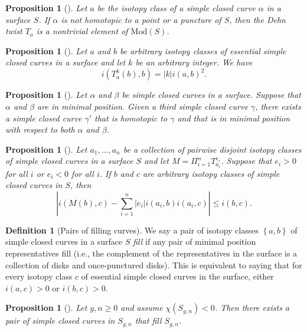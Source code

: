\documentclass[reqno]{amsart}
\newtheorem{proposition}[theorem]{Proposition}
\theoremstyle{definition}
\newtheorem{definition}[theorem]{Definition}
\theoremstyle{remark}
\newcommand{\Mod}{{\mathrm{Mod}}}
\begin{document}
\begin{proposition}[]
    Let $a$ be the isotopy class of a simple closed curve
    $\alpha$ in a surface $S$. If $\alpha$ is not
    homotopic to a point or a puncture of $S$, then the
    Dehn twist $T_a$ is a nontrivial element of $\Mod(S)$.
\end{proposition}

\begin{proposition}[]
    Let $a$ and $b$ be arbitrary isotopy classes of essential
    simple closed curves in a surface and let $k$ be
    an arbitrary integer. We have
    \[
    i \left( T_{a}^{k}(b), b \right) =
    \left| k \right| i\left( a,b \right)^2.
    \] 
\end{proposition}

\begin{proposition}[]
    Let $\alpha$ and $\beta$ be simple closed curves in a surface.
    Suppose that $\alpha$ and $\beta$ are in minimal position.
    Given a third simple closed curve $\gamma$, there
    exists a simple closed curve $\gamma'$ that is
    homotopic to $\gamma$ and that is in minimal position
    with respect to both $\alpha$ and $\beta$.
\end{proposition}


\begin{proposition}[]
    Let $a_1 ,\ldots, a_n$ be a collection of pairwise
    disjoint isotopy classes of simple closed curves in
    a surface $S$ and let $M = \Pi_{i=1}^{n}T_{a_i}^{e_i}$.
    Suppose that $e_i > 0$ for all $i$ or $e_i < 0$ for
    all $i$. If $b$ and $c$ are arbitrary isotopy
    classes of simple closed curves in $S$, then
    \[
    \left| i \left( M(b), c \right) -
    \sum_{i=1}^{n} \left| e_i \right| i(a_i,b)
    i(a_i,c) \right| \le i(b,c).
    \] 
\end{proposition}

\begin{definition}[Pairs of filling curves]
    We say a pair of isotopy classes $\left\{ a,b \right\} $ of
    simple closed curves in a surface $S$ \textit{fill} if
    any pair of minimal position representatives
    fill (i.e., the complement of the representatives
    in the surface is a collection of disks and
    once-punctured disks).
    This is equivalent to saying that for every
    isotopy class $c$ of essential simple closed curves
    in the surface, either
    $i \left( a,c \right) >0$ or $i(b,c) > 0$.
\end{definition}

\begin{proposition}[]
    Let $g, n \ge 0$ and assume $\chi \left( S_{g,n} \right) <0$.
    Then there exists a pair of simple closed curves in
    $S_{g,n}$ that fill $S_{g,n}$.
\end{proposition}
\end{document}
